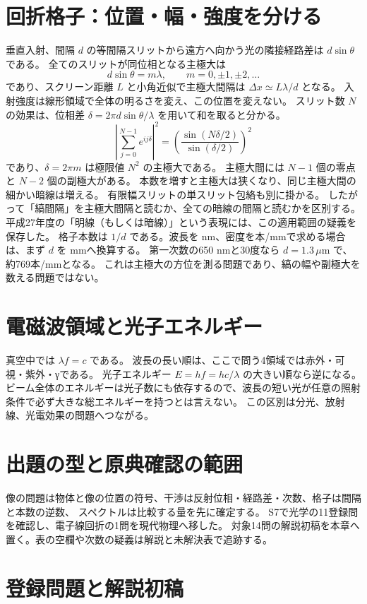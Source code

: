 \section{回折格子：位置・幅・強度を分ける}\label{theory:optics:grating}
垂直入射、間隔 \(d\) の等間隔スリットから遠方へ向かう光の隣接経路差は \(d\sin\theta\) である。
全てのスリットが同位相となる主極大は
\[
 d\sin\theta=m\lambda,\qquad m=0,\pm1,\pm2,\ldots
\]
であり、スクリーン距離 \(L\) と小角近似で主極大間隔は \(\Delta x\simeq L\lambda/d\) となる\cite{os_grating}。
入射強度は線形領域で全体の明るさを変え、この位置を変えない。
スリット数 \(N\) の効果は、位相差 \(\delta=2\pi d\sin\theta/\lambda\) を用いて和を取ると分かる。
\[
 \left|\sum_{j=0}^{N-1}e^{ij\delta}\right|^2
 =\left(\frac{\sin(N\delta/2)}{\sin(\delta/2)}\right)^2
\]
であり、\(\delta=2\pi m\) は極限値 \(N^2\) の主極大である。
主極大間には \(N-1\) 個の零点と \(N-2\) 個の副極大がある。
本数を増すと主極大は狭くなり、同じ主極大間の細かい暗線は増える。
有限幅スリットの単スリット包絡も別に掛かる\cite{os_double}。
したがって「縞間隔」を主極大間隔と読むか、全ての暗線の間隔と読むかを区別する。
平成27年度の「明線（もしくは暗線）」という表現には、この適用範囲の疑義を保存した。
格子本数は \(1/d\) である。波長を nm、密度を本/mmで求める場合は、まず \(d\) を mmへ換算する。
第一次数の650 nmと30度なら \(d=1.3\,\mu\mathrm m\) で、約769本/mmとなる。
これは主極大の方位を測る問題であり、縞の幅や副極大を数える問題ではない。

\section{電磁波領域と光子エネルギー}\label{theory:optics:spectrum}
真空中では \(\lambda f=c\) である。
波長の長い順は、ここで問う4領域では赤外・可視・紫外・γである\cite{os_spectrum}。
光子エネルギー \(E=hf=hc/\lambda\) の大きい順なら逆になる。
ビーム全体のエネルギーは光子数にも依存するので、波長の短い光が任意の照射条件で必ず大きな総エネルギーを持つとは言えない。
この区別は分光、放射線、光電効果の問題へつながる。

\section{出題の型と原典確認の範囲}
像の問題は物体と像の位置の符号、干渉は反射位相・経路差・次数、格子は間隔と本数の逆数、
スペクトルは比較する量を先に確定する。
S7で光学の11登録問を確認し、電子線回折の1問を現代物理へ移した。
対象14問の解説初稿を本章へ置く。表の空欄や次数の疑義は解説と未解決表で追跡する。

\section{登録問題と解説初稿}

